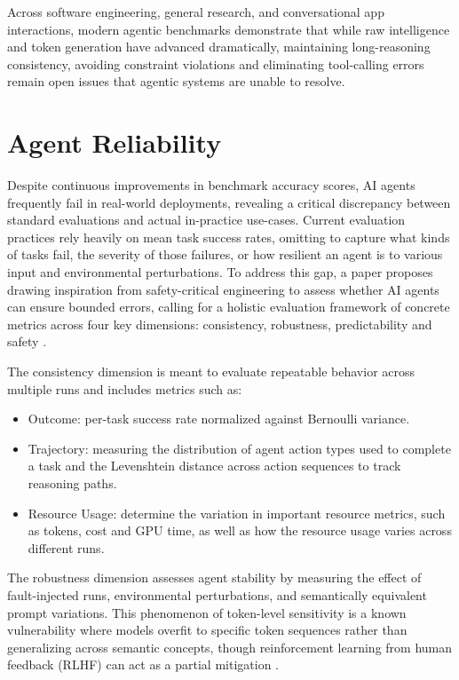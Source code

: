 \documentclass[conference]{IEEEtran}
\begin{document}
Across software engineering, general research, and conversational app interactions, 
modern agentic benchmarks demonstrate that while raw intelligence and token generation have 
advanced dramatically, maintaining long-reasoning consistency, avoiding constraint violations
and eliminating tool-calling errors remain open issues that agentic systems are unable to resolve.

\section{Agent Reliability}
Despite continuous improvements in benchmark accuracy scores, 
AI agents frequently fail in real-world deployments, revealing a critical discrepancy 
between standard evaluations and actual in-practice use-cases. 
Current evaluation practices rely heavily on mean task success rates, omitting to 
capture what kinds of tasks fail, the severity of those failures, or how resilient an 
agent is to various input and environmental perturbations. 
To address this gap, a paper proposes drawing inspiration from safety-critical engineering to 
assess whether AI agents can ensure bounded errors, calling for a holistic
evaluation framework of concrete metrics across four key dimensions: 
consistency, robustness, predictability and safety \cite{rabanser_towards_2026}.

The consistency dimension is meant to evaluate repeatable behavior across multiple runs and includes 
metrics such as: 
\begin{itemize}
	\item Outcome: per-task success rate normalized against Bernoulli variance.
	\item Trajectory: measuring the distribution of agent action types used to complete a task and
		the Levenshtein distance across action sequences to track reasoning paths. 
	\item Resource Usage: determine the variation in important resource metrics, such as tokens,
		cost and GPU time, as well as how the resource usage varies across different runs.
\end{itemize}

The robustness dimension assesses agent stability by measuring the effect of fault-injected runs,
environmental perturbations, and semantically equivalent prompt variations. 
This phenomenon of token-level sensitivity is a known vulnerability where models overfit to specific 
token sequences rather than generalizing across semantic concepts, 
though reinforcement learning from human feedback (RLHF) can act as a partial mitigation
\cite{cox_mapping_2025}.
\end{document}
